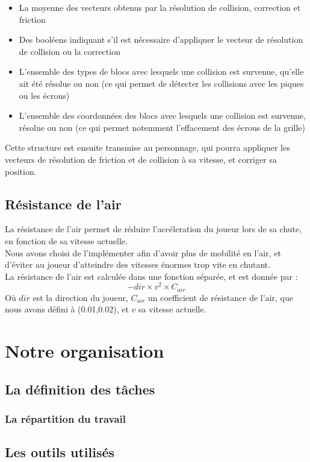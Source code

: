 \documentclass[10pt]{report}
\begin{document}
\begin{itemize}
  \item La moyenne des vecteurs obtenus par la résolution de collision, correction et friction
  \item Des booléens indiquant s'il est nécessaire d'appliquer le vecteur de résolution de collision ou la correction
  \item L'ensemble des types de blocs avec lesquels une collision est survenue, qu'elle ait été résolue ou non
  (ce qui permet de détecter les collisions avec les piques ou les écrous)
  \item L'ensemble des coordonnées des blocs avec lesquels une collision est survenue, résolue ou non
  (ce qui permet notemment l'effacement des écrous de la grille)
\end{itemize}

Cette structure est ensuite transmise au personnage, qui pourra appliquer les vecteurs de résolution de friction
et de collision à sa vitesse, et corriger sa position.

\subsection{Résistance de l'air}
La résistance de l'air permet de réduire l'accéleration du joueur lors de sa chute,
en fonction de sa vitesse actuelle.\\
Nous avons choisi de l'implémenter afin d'avoir plus de mobilité en l'air, et d'éviter au joueur d'atteindre
des vitesses énormes trop vite en chutant.\\
La résistance de l'air est calculée dans une fonction séparée, et est donnée par :
\[
 -dir \times v^2 \times C_{air}
\]
Où \(dir\) est la direction du joueur, \(C_{air}\) un coefficient de résistance de l'air, que nous avons défini à (0.01,0.02), et \(v\) sa vitesse actuelle.

\section{Notre organisation}
\subsection{La définition des tâches}
\subsubsection{La répartition du travail}
\subsection{Les outils utilisés}
\end{document}
